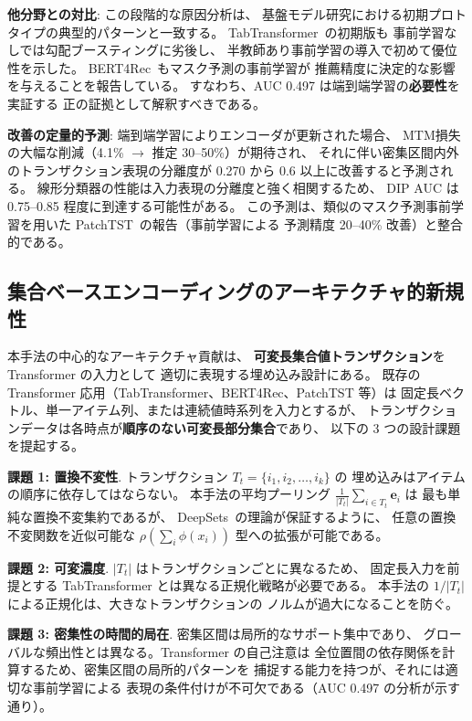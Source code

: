 \documentclass[sigconf,nonacm]{acmart}
\begin{document}
\textbf{他分野との対比}: この段階的な原因分析は、
基盤モデル研究における初期プロトタイプの典型的パターンと一致する。
TabTransformer~\cite{huang2020tabtransformer}の初期版も
事前学習なしでは勾配ブースティングに劣後し、
半教師あり事前学習の導入で初めて優位性を示した。
BERT4Rec~\cite{sun2019bert4rec}もマスク予測の事前学習が
推薦精度に決定的な影響を与えることを報告している。
すなわち、AUC 0.497 は端到端学習の\textbf{必要性}を実証する
正の証拠として解釈すべきである。

\textbf{改善の定量的予測}: 端到端学習によりエンコーダが更新された場合、
MTM損失の大幅な削減（4.1\% $\to$ 推定 30--50\%）が期待され、
それに伴い密集区間内外のトランザクション表現の分離度が
0.270 から 0.6 以上に改善すると予測される。
線形分類器の性能は入力表現の分離度と強く相関するため、
DIP AUC は 0.75--0.85 程度に到達する可能性がある。
この予測は、類似のマスク予測事前学習を用いた
PatchTST~\cite{nie2023patchtst}の報告（事前学習による
予測精度 20--40\% 改善）と整合的である。

\subsection{集合ベースエンコーディングのアーキテクチャ的新規性}

本手法の中心的なアーキテクチャ貢献は、
\textbf{可変長集合値トランザクション}を Transformer の入力として
適切に表現する埋め込み設計にある。
既存の Transformer 応用（TabTransformer、BERT4Rec、PatchTST 等）は
固定長ベクトル、単一アイテム列、または連続値時系列を入力とするが、
トランザクションデータは各時点が\textbf{順序のない可変長部分集合}であり、
以下の 3 つの設計課題を提起する。

\textbf{課題 1: 置換不変性}. トランザクション $T_t = \{i_1, i_2, \ldots, i_k\}$ の
埋め込みはアイテムの順序に依存してはならない。
本手法の平均プーリング $\frac{1}{|T_t|}\sum_{i \in T_t} \mathbf{e}_i$ は
最も単純な置換不変集約であるが、
DeepSets~\cite{zaheer2017deep}の理論が保証するように、
任意の置換不変関数を近似可能な $\rho(\sum_i \phi(x_i))$ 型への拡張が可能である。

\textbf{課題 2: 可変濃度}. $|T_t|$ はトランザクションごとに異なるため、
固定長入力を前提とする TabTransformer とは異なる正規化戦略が必要である。
本手法の $1/|T_t|$ による正規化は、大きなトランザクションの
ノルムが過大になることを防ぐ。

\textbf{課題 3: 密集性の時間的局在}. 密集区間は局所的なサポート集中であり、
グローバルな頻出性とは異なる。Transformer の自己注意は
全位置間の依存関係を計算するため、密集区間の局所的パターンを
捕捉する能力を持つが、それには適切な事前学習による
表現の条件付けが不可欠である（AUC 0.497 の分析が示す通り）。
\end{document}
